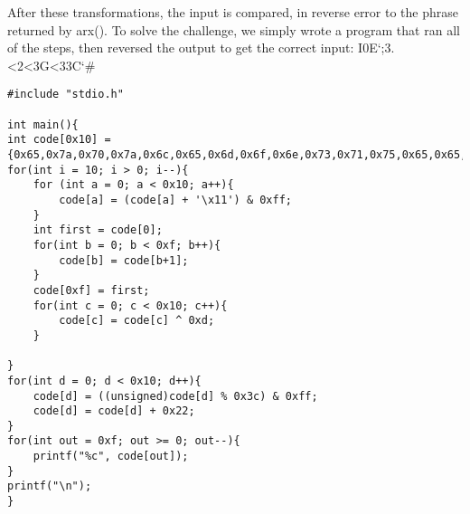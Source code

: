 After these transformations, the input is compared, in reverse error to the phrase returned by arx(). To solve the challenge, we simply wrote a program that ran all of the steps, then reversed the output to get the correct input: I0E\char`;3.<2<3G<33C\char`#

\begin{lstlisting}
#include "stdio.h"

int main(){
int code[0x10] = {0x65,0x7a,0x70,0x7a,0x6c,0x65,0x6d,0x6f,0x6e,0x73,0x71,0x75,0x65,0x65,0x7a,0x79};
for(int i = 10; i > 0; i--){
	for (int a = 0; a < 0x10; a++){
		code[a] = (code[a] + '\x11') & 0xff;
	}
	int first = code[0];
	for(int b = 0; b < 0xf; b++){
		code[b] = code[b+1];
	}
	code[0xf] = first;
	for(int c = 0; c < 0x10; c++){
		code[c] = code[c] ^ 0xd;
	}

}
for(int d = 0; d < 0x10; d++){
	code[d] = ((unsigned)code[d] % 0x3c) & 0xff;
	code[d] = code[d] + 0x22;
}
for(int out = 0xf; out >= 0; out--){
	printf("%c", code[out]);
}
printf("\n");
}
\end{lstlisting}